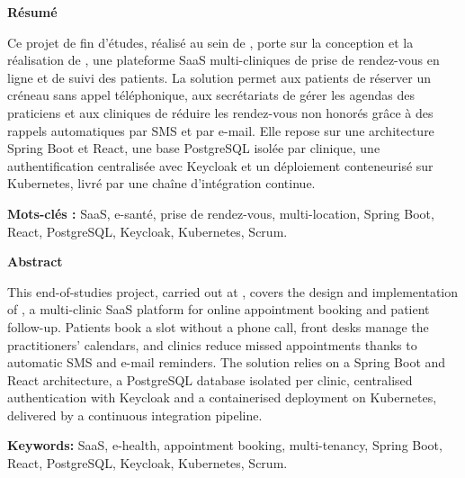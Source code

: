 \clearpage
\thispagestyle{empty}
\noindent\textbf{\large Résumé}\par\medskip
\noindent Ce projet de fin d'études, réalisé au sein de \entreprise, porte sur la conception et la réalisation de \nomprojet, une plateforme SaaS multi-cliniques de prise de rendez-vous en ligne et de suivi des patients. La solution permet aux patients de réserver un créneau sans appel téléphonique, aux secrétariats de gérer les agendas des praticiens et aux cliniques de réduire les rendez-vous non honorés grâce à des rappels automatiques par SMS et par e-mail. Elle repose sur une architecture Spring Boot et React, une base PostgreSQL isolée par clinique, une authentification centralisée avec Keycloak et un déploiement conteneurisé sur Kubernetes, livré par une chaîne d'intégration continue. 

\noindent\textbf{Mots-clés :} SaaS, e-santé, prise de rendez-vous, multi-location, Spring Boot, React, PostgreSQL, Keycloak, Kubernetes, Scrum.

\vspace{1.5cm}
\noindent\textbf{\large Abstract}\par\medskip
\noindent This end-of-studies project, carried out at \entreprise, covers the design and implementation of \nomprojet, a multi-clinic SaaS platform for online appointment booking and patient follow-up. Patients book a slot without a phone call, front desks manage the practitioners' calendars, and clinics reduce missed appointments thanks to automatic SMS and e-mail reminders. The solution relies on a Spring Boot and React architecture, a PostgreSQL database isolated per clinic, centralised authentication with Keycloak and a containerised deployment on Kubernetes, delivered by a continuous integration pipeline. 

\noindent\textbf{Keywords:} SaaS, e-health, appointment booking, multi-tenancy, Spring Boot, React, PostgreSQL, Keycloak, Kubernetes, Scrum.
